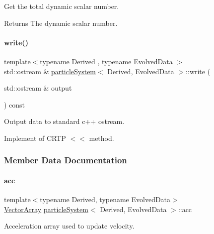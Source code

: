 Get the total dynamic scalar number. 

\begin{DoxyReturn}{Returns}
The dynamic scalar number. 
\end{DoxyReturn}
\mbox{\label{classparticle_system_a7f37791caaafd35f6c2d7afcc2a49b34}} 
\paragraph{\texorpdfstring{write()}{write()}}
{\footnotesize\ttfamily template$<$typename Derived , typename Evolved\+Data $>$ \\
std\+::ostream \& \mbox{\hyperlink{classparticle_system}{particle\+System}}$<$ Derived, Evolved\+Data $>$\+::write (\begin{DoxyParamCaption}\item[{std\+::ostream \&}]{output }\end{DoxyParamCaption}) const}



Output data to standard c++ ostream. 

Implement of C\+R\+TP \textquotesingle{}$<$$<$\textquotesingle{} method. 

\subsubsection{Member Data Documentation}
\mbox{\label{classparticle_system_ad7e503534c878abae38d4b06f50286fb}} 
\paragraph{\texorpdfstring{acc}{acc}}
{\footnotesize\ttfamily template$<$typename Derived, typename Evolved\+Data$>$ \\
\mbox{\hyperlink{classparticle_system_a6f66ed187a286c0d42ab2f83b8b6193b}{Vector\+Array}} \mbox{\hyperlink{classparticle_system}{particle\+System}}$<$ Derived, Evolved\+Data $>$\+::acc\hspace{0.3cm}{\ttfamily [protected]}}



Acceleration array used to update velocity. 

